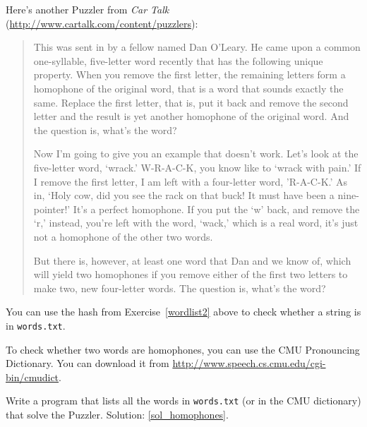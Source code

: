 \begin{exercise}
\label{homophones}

Here's another Puzzler from {\em Car Talk} 
(\url{http://www.cartalk.com/content/puzzlers}):

\begin{quote}
This was sent in by a fellow named Dan O'Leary. He came upon a common
one-syllable, five-letter word recently that has the following unique
property. When you remove the first letter, the remaining letters form
a homophone of the original word, that is a word that sounds exactly
the same. Replace the first letter, that is, put it back and remove
the second letter and the result is yet another homophone of the
original word. And the question is, what's the word?

Now I'm going to give you an example that doesn't work. Let's look at
the five-letter word, `wrack.' W-R-A-C-K, you know like to `wrack with
pain.' If I remove the first letter, I am left with a four-letter
word, 'R-A-C-K.' As in, `Holy cow, did you see the rack on that buck!
It must have been a nine-pointer!' It's a perfect homophone. If you
put the `w' back, and remove the `r,' instead, you're left with the
word, `wack,' which is a real word, it's just not a homophone of the
other two words.

But there is, however, at least one word that Dan and we know of,
which will yield two homophones if you remove either of the first two
letters to make two, new four-letter words. The question is, what's
the word?
\end{quote}

You can use the hash from Exercise~\ref{wordlist2} above to check
whether a string is in {\tt words.txt}.

To check whether two words are homophones, you can use the CMU
Pronouncing Dictionary.  You can download it from
\url{http://www.speech.cs.cmu.edu/cgi-bin/cmudict}.

Write a program that lists all the words in {\tt words.txt} 
(or in the CMU dictionary) that solve the Puzzler.
Solution: \ref{sol_homophones}.

\end{exercise}


